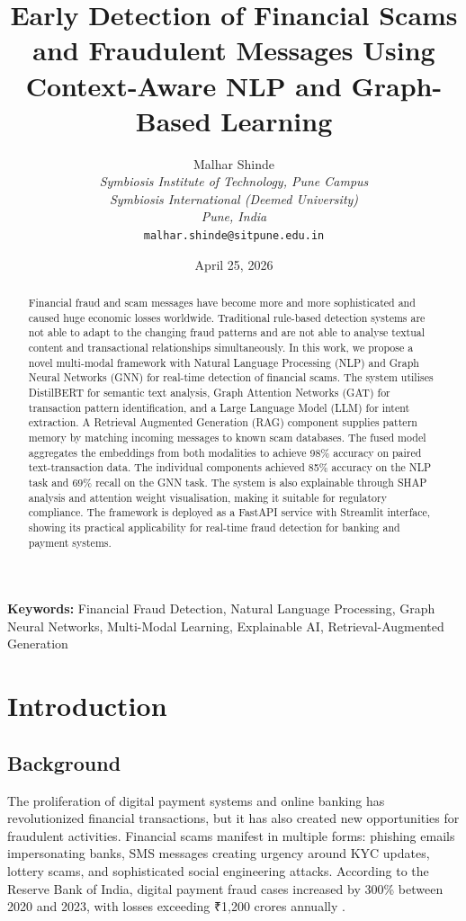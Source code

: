 \documentclass[12pt,a4paper]{article}
\title{\textbf{Early Detection of Financial Scams and Fraudulent Messages Using Context-Aware NLP and Graph-Based Learning}}
\author{
    Malhar Shinde \\
    \textit{Symbiosis Institute of Technology, Pune Campus} \\
    \textit{Symbiosis International (Deemed University)} \\
    \textit{Pune, India} \\
    \texttt{malhar.shinde@sitpune.edu.in}
}
\date{April 25, 2026}
\begin{document}
\maketitle

\begin{abstract}
Financial fraud and scam messages have become more and more sophisticated and caused huge economic losses worldwide. Traditional rule-based detection systems are not able to adapt to the changing fraud patterns and are not able to analyse textual content and transactional relationships simultaneously. In this work, we propose a novel multi-modal framework with Natural Language Processing (NLP) and Graph Neural Networks (GNN) for real-time detection of financial scams. The system utilises DistilBERT for semantic text analysis, Graph Attention Networks (GAT) for transaction pattern identification, and a Large Language Model (LLM) for intent extraction. A Retrieval Augmented Generation (RAG) component supplies pattern memory by matching incoming messages to known scam databases. The fused model aggregates the embeddings from both modalities to achieve 98\% accuracy on paired text-transaction data. The individual components achieved 85\% accuracy on the NLP task and 69\% recall on the GNN task. The system is also explainable through SHAP analysis and attention weight visualisation, making it suitable for regulatory compliance. The framework is deployed as a FastAPI service with Streamlit interface, showing its practical applicability for real-time fraud detection for banking and payment systems.
\end{abstract}

\noindent\textbf{Keywords:} Financial Fraud Detection, Natural Language Processing, Graph Neural Networks, Multi-Modal Learning, Explainable AI, Retrieval-Augmented Generation

\newpage
\tableofcontents
\newpage

\section{Introduction}

\subsection{Background}

The proliferation of digital payment systems and online banking has revolutionized financial transactions, but it has also created new opportunities for fraudulent activities. Financial scams manifest in multiple forms: phishing emails impersonating banks, SMS messages creating urgency around KYC updates, lottery scams, and sophisticated social engineering attacks. According to the Reserve Bank of India, digital payment fraud cases increased by 300\% between 2020 and 2023, with losses exceeding ₹1,200 crores annually \cite{rbi2023}.
\end{document}
